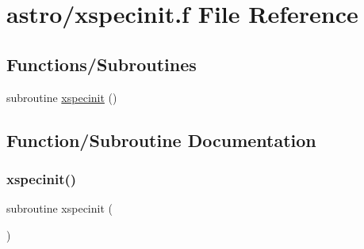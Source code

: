\hypertarget{xspecinit_8f}{}\section{astro/xspecinit.f File Reference}
\label{xspecinit_8f}
\subsection*{Functions/\+Subroutines}
\begin{DoxyCompactItemize}
\item 
subroutine \hyperlink{xspecinit_8f_a75e190cf65c45bd656f0a9b5bb4d84cf}{xspecinit} ()
\end{DoxyCompactItemize}


\subsection{Function/\+Subroutine Documentation}
\mbox{\label{xspecinit_8f_a75e190cf65c45bd656f0a9b5bb4d84cf}} 
\subsubsection{\texorpdfstring{xspecinit()}{xspecinit()}}
{\footnotesize\ttfamily subroutine xspecinit (\begin{DoxyParamCaption}{ }\end{DoxyParamCaption})}

